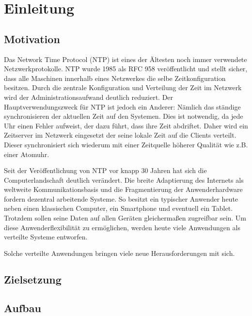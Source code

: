 \section{Einleitung}
\subsection{Motivation}
Das Network Time Protocol (NTP) ist eines der Ältesten noch immer verwendete Netzwerkprotokolle.
NTP wurde 1985 als RFC 958 veröffentlicht und stellt sicher, dass alle Maschinen innerhalb eines Netzwerkes die selbe Zeitkonfiguration besitzen.
Durch die zentrale Konfiguration und Verteilung der Zeit im Netzwerk wird der Administrationsaufwand deutlich reduziert.
Der Hauptverwendungszweck für NTP ist jedoch ein Anderer: Nämlich das ständige synchronisieren der aktuellen Zeit auf den Systemen.
Dies ist notwendig, da jede Uhr einen Fehler aufweist, der dazu führt, dass ihre Zeit abdriftet.
Daher wird ein Zeitserver im Netzwerk eingesetzt der seine lokale Zeit auf die Clients verteilt.
Dieser synchronisiert sich wiederum mit einer Zeitquelle höherer Qualität wie z.B. einer Atomuhr.

Seit der Veröffentlichung von NTP vor knapp 30 Jahren hat sich die Computerlandschaft deutlich verändert.
Die breite Adaptierung des Internets als weltweite Kommunikationsbasis und die Fragmentierung der Anwenderhardware fordern dezentral arbeitende Systeme.
So besitzt ein typischer Anwender heute neben einen klassischen Computer, ein Smartphone und eventuell ein Tablet.
Trotzdem sollen seine Daten auf allen Geräten gleichermaßen zugreifbar sein.
Um diese Anwenderflexibilität zu ermöglichen, werden heute viele Anwendungen als verteilte Systeme entworfen.

Solche verteilte Anwendungen bringen viele neue Herausforderungen mit sich.


\subsection{Zielsetzung}
\subsection{Aufbau}

    
  
